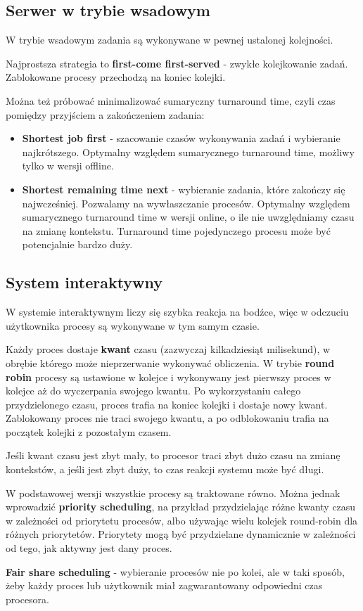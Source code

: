 \subsection{Serwer w trybie wsadowym}

W trybie wsadowym zadania są wykonywane w pewnej ustalonej kolejności.

Najprostsza strategia to \textbf{first-come first-served} - zwykłe kolejkowanie zadań. Zablokowane procesy przechodzą na koniec kolejki.

Można też próbować minimalizować sumaryczny turnaround time, czyli czas pomiędzy przyjściem a zakończeniem zadania:
\begin{itemize}
    \item \textbf{Shortest job first} - szacowanie czasów wykonywania zadań i wybieranie najkrótszego. Optymalny względem sumarycznego turnaround time, możliwy tylko w wersji offline.
    \item \textbf{Shortest remaining time next} - wybieranie zadania, które zakończy się najwcześniej. Pozwalamy na wywłaszczanie procesów. Optymalny względem sumarycznego turnaround time w wersji online, o ile nie uwzględniamy czasu na zmianę kontekstu. Turnaround time pojedynczego procesu może być potencjalnie bardzo duży.
\end{itemize}

\subsection{System interaktywny}

W systemie interaktywnym liczy się szybka reakcja na bodźce, więc w odczuciu użytkownika procesy są wykonywane w tym samym czasie.

Każdy proces dostaje \textbf{kwant} czasu (zazwyczaj kilkadziesiąt milisekund), w obrębie którego może nieprzerwanie wykonywać obliczenia. W trybie \textbf{round robin} procesy są ustawione w kolejce i wykonywany jest pierwszy proces w kolejce aż do wyczerpania swojego kwantu. Po wykorzystaniu całego przydzielonego czasu, proces trafia na koniec kolejki i dostaje nowy kwant. Zablokowany proces nie traci swojego kwantu, a po odblokowaniu trafia na początek kolejki z pozostałym czasem.

Jeśli kwant czasu jest zbyt mały, to procesor traci zbyt dużo czasu na zmianę kontekstów, a jeśli jest zbyt duży, to czas reakcji systemu może być długi.

W podstawowej wersji wszystkie procesy są traktowane równo. Można jednak wprowadzić \textbf{priority scheduling}, na przykład przydzielając różne kwanty czasu w zależności od priorytetu procesów, albo używając wielu kolejek round-robin dla różnych priorytetów. Priorytety mogą być przydzielane dynamicznie w zależności od tego, jak aktywny jest dany proces.

\textbf{Fair share scheduling} - wybieranie procesów nie po kolei, ale w taki sposób, żeby każdy proces lub użytkownik miał zagwarantowany odpowiedni czas procesora.